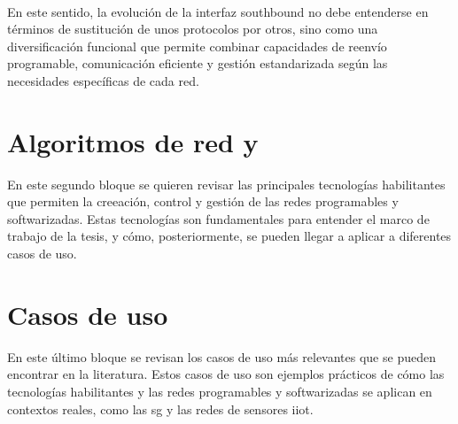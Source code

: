 \\
En este sentido, la evolución de la interfaz southbound no debe entenderse en términos de sustitución de unos protocolos por otros, sino como una diversificación funcional que permite combinar capacidades de reenvío programable, comunicación eficiente y gestión estandarizada según las necesidades específicas de cada red.





\section{Algoritmos de red y }
\label{sec:tecnologias_habilitantes}

En este segundo bloque se quieren revisar las principales tecnologías habilitantes que permiten la creeación, control y gestión de las redes programables y softwarizadas. Estas tecnologías son fundamentales para entender el marco de trabajo de la tesis, y cómo, posteriormente, se pueden llegar a aplicar a diferentes casos de uso. 


\section{Casos de uso}  
\label{sec:casos_de_uso}
En este último bloque se revisan los casos de uso más relevantes que se pueden encontrar en la literatura. Estos casos de uso son ejemplos prácticos de cómo las tecnologías habilitantes y las redes programables y softwarizadas se aplican en contextos reales, como las \gls{sg} y las redes de sensores \gls{iiot}. 